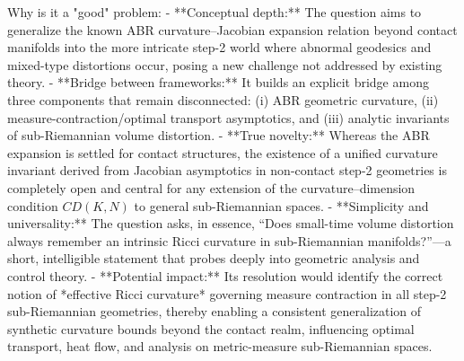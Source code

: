 Why is it a "good" problem:  
- **Conceptual depth:** The question aims to generalize the known ABR curvature–Jacobian expansion relation beyond contact manifolds into the more intricate step-2 world where abnormal geodesics and mixed-type distortions occur, posing a new challenge not addressed by existing theory.  
- **Bridge between frameworks:** It builds an explicit bridge among three components that remain disconnected: (i) ABR geometric curvature, (ii) measure-contraction/optimal transport asymptotics, and (iii) analytic invariants of sub-Riemannian volume distortion.  
- **True novelty:** Whereas the ABR expansion is settled for contact structures, the existence of a unified curvature invariant derived from Jacobian asymptotics in non-contact step-2 geometries is completely open and central for any extension of the curvature–dimension condition \(CD(K,N)\) to general sub-Riemannian spaces.  
- **Simplicity and universality:** The question asks, in essence, “Does small-time volume distortion always remember an intrinsic Ricci curvature in sub-Riemannian manifolds?”—a short, intelligible statement that probes deeply into geometric analysis and control theory.  
- **Potential impact:** Its resolution would identify the correct notion of *effective Ricci curvature* governing measure contraction in all step-2 sub-Riemannian geometries, thereby enabling a consistent generalization of synthetic curvature bounds beyond the contact realm, influencing optimal transport, heat flow, and analysis on metric-measure sub-Riemannian spaces.
